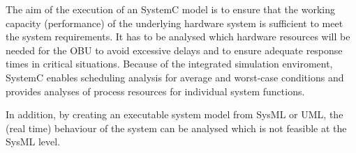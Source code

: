 The aim of the execution of an SystemC model is to ensure that the
working capacity (performance) of the underlying hardware system is
sufficient to meet the system requirements. It has to be analysed
which hardware resources will be needed for the OBU to avoid excessive
delays and to ensure adequate response times in critical situations.
Because of the integrated simulation enviroment, SystemC enables
scheduling analysis for average and worst-case conditions and provides
analyses of process resources for individual system functions.

In addition, by creating an executable system model from SysML or UML,
the (real time) behaviour of the system can be analysed which is not
feasible at the SysML level.




